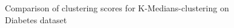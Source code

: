 \begin{figure}[H]
	\centering
	
	\caption{Comparison of clustering scores for K-Medians-clustering on Diabetes dataset}%
	\label{fig:kmedians_diabetes}
\end{figure}

